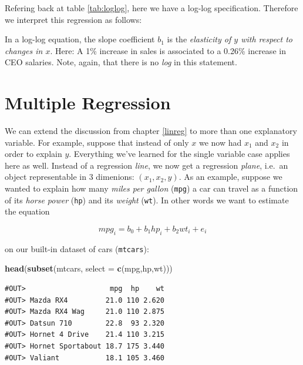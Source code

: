 \documentclass[]{book}
\newenvironment{Shaded}{\begin{snugshade}}{\end{snugshade}}
\newcommand{\DataTypeTok}[1]{\textcolor[rgb]{0.13,0.29,0.53}{#1}}
\newcommand{\KeywordTok}[1]{\textcolor[rgb]{0.13,0.29,0.53}{\textbf{#1}}}
\newcommand{\NormalTok}[1]{#1}
\newenvironment{tip}{\begin{tcolorbox}[colback=green!5!white,colframe=green]}{\end{tcolorbox}}
\begin{document}
Refering back at table \ref{tab:loglog}, here we have a log-log specification. Therefore we interpret this regression as follows:

\begin{tip}
In a log-log equation, the slope coefficient \(b_1\) is the
\emph{elasticity of \(y\) with respect to changes in \(x\)}. Here: A 1\%
increase in sales is associated to a 0.26\% increase in CEO salaries.
Note, again, that there is no \emph{log} in this statement.
\end{tip}

\hypertarget{multiple-reg}{%
\chapter{Multiple Regression}\label{multiple-reg}}

We can extend the discussion from chapter \ref{linreg} to more than one explanatory variable. For example, suppose that instead of only \(x\) we now had \(x_1\) and \(x_2\) in order to explain \(y\). Everything we've learned for the single variable case applies here as well. Instead of a regression \emph{line}, we now get a regression \emph{plane}, i.e.~an object representable in 3 dimenions: \((x_1,x_2,y)\).
As an example, suppose we wanted to explain how many \emph{miles per gallon} (\texttt{mpg}) a car can travel as a function of its \emph{horse power} (\texttt{hp}) and its \emph{weight} (\texttt{wt}). In other words we want to estimate the equation

\begin{equation}
mpg_i = b_0 + b_1 hp_i + b_2 wt_i + e_i \label{eq:abline2d}
\end{equation}

on our built-in dataset of cars (\texttt{mtcars}):

\begin{Shaded}
\begin{Highlighting}[]
\KeywordTok{head}\NormalTok{(}\KeywordTok{subset}\NormalTok{(mtcars, }\DataTypeTok{select =} \KeywordTok{c}\NormalTok{(mpg,hp,wt)))}
\end{Highlighting}
\end{Shaded}

\begin{verbatim}
#OUT>                    mpg  hp    wt
#OUT> Mazda RX4         21.0 110 2.620
#OUT> Mazda RX4 Wag     21.0 110 2.875
#OUT> Datsun 710        22.8  93 2.320
#OUT> Hornet 4 Drive    21.4 110 3.215
#OUT> Hornet Sportabout 18.7 175 3.440
#OUT> Valiant           18.1 105 3.460
\end{verbatim}
\end{document}
